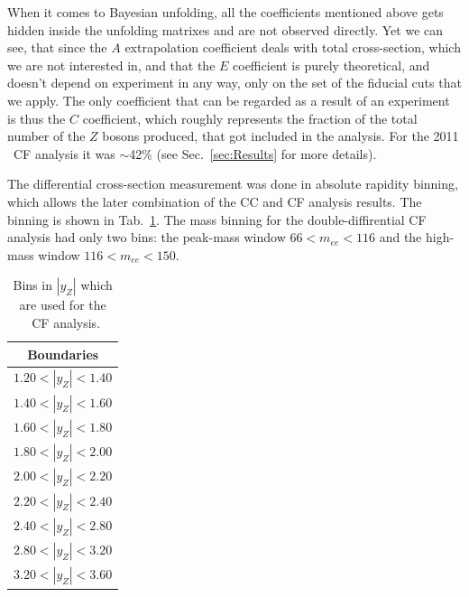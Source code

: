 When it comes to Bayesian unfolding, all the coefficients mentioned above gets hidden inside the unfolding matrixes and are not observed directly. Yet we can see, that since the $A$ extrapolation coefficient deals with total cross-section, which we are not interested in, and that the $E$ coefficient is purely theoretical, and doesn't depend on experiment in any way, only on the set of the fiducial cuts that we apply. The only coefficient that can be regarded as a result of an experiment is thus the $C$ coefficient, which roughly represents the fraction of the total number of the $Z$ bosons produced, that got included in the analysis. For the 2011 \Zee\ CF analysis it was $\sim$42\% (see Sec.~\ref{sec:Results} for more details).

The differential cross-section measurement was done in absolute rapidity binning, which allows the later combination of the CC and CF analysis results. The binning is shown in Tab.~\ref{tab:ZeeCS_bins}. The mass binning for the double-diffirential CF analysis had only two bins: the peak-mass window $66 < m_{ee} < 116$ and the high-mass window $116 < m_{ee} < 150$.

\begin{table}
\centering
\begin{tabular}{c}
\hline\hline
Boundaries\\\hline
$1.20 < |y_{Z}| <1.40$\\
$1.40 < |y_{Z}| <1.60$\\
$1.60 < |y_{Z}| <1.80$\\
$1.80 < |y_{Z}| <2.00$\\
$2.00 < |y_{Z}| <2.20$\\
$2.20 < |y_{Z}| <2.40$\\
$2.40 < |y_{Z}| <2.80$\\
$2.80 < |y_{Z}| <3.20$\\
$3.20 < |y_{Z}| <3.60$\\
\hline\hline
\end{tabular}
\caption{Bins in $|y_{Z}|$ which are used for the \Zee\ CF analysis.}
\label{tab:ZeeCS_bins}
\end{table}
